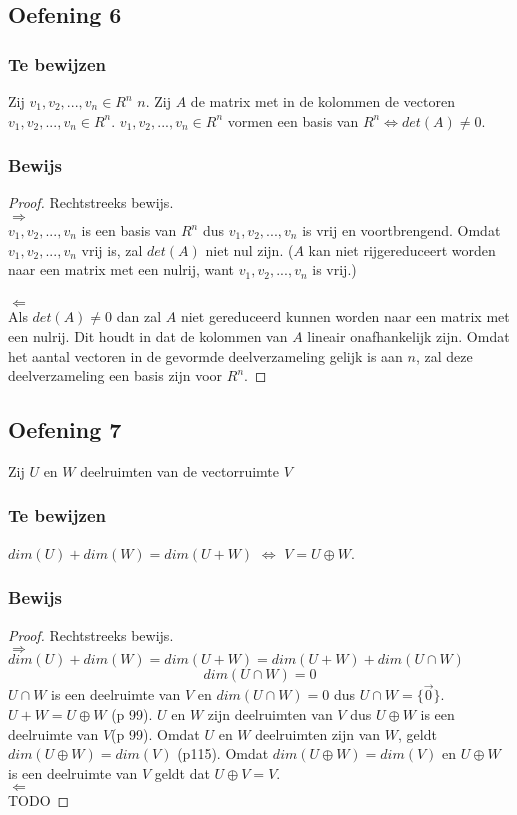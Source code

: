\documentclass[lineaire_algebra_oplossingen.tex]{subfiles}
\begin{document}
\subsection{Oefening 6}
\subsubsection*{Te bewijzen}
Zij $v_1,v_2,...,v_n \in R^n$ $n$. Zij $A$ de matrix met in de kolommen de vectoren $v_1,v_2,...,v_n \in R^n$.
$v_1,v_2,...,v_n \in R^n$ vormen een basis van $R^n \Leftrightarrow det(A) \neq 0$.
\subsubsection*{Bewijs}
\begin{proof}
Rechtstreeks bewijs.\\
\emph{$\Rightarrow$}\\
$v_1,v_2,...,v_n$ is een basis van $R^n$ dus $v_1,v_2,...,v_n$ is vrij en voortbrengend. Omdat $v_1,v_2,...,v_n$ vrij is, zal $det(A)$ niet nul zijn. ($A$ kan niet rijgereduceert worden naar een matrix met een nulrij, want $v_1,v_2,...,v_n$ is vrij.)\\\\
\emph{$\Leftarrow$}\\
Als $det(A) \neq 0$ dan zal $A$ niet gereduceerd kunnen worden naar een matrix met een nulrij. Dit houdt in dat de kolommen van $A$ lineair onafhankelijk zijn. Omdat het aantal vectoren in de gevormde deelverzameling gelijk is aan $n$, zal deze deelverzameling een basis zijn voor $R^n$.
\end{proof}

\subsection{Oefening 7}
Zij $U$ en $W$ deelruimten van de vectorruimte $V$
\subsubsection*{Te bewijzen}
$dim(U) + dim(W) = dim(U+W)$ $\Leftrightarrow$ $V = U \oplus W$.
\subsubsection*{Bewijs}
\begin{proof}
Rechtstreeks bewijs.\\
\emph{$\Rightarrow$}\\
$dim(U) + dim(W) = dim(U+W)= dim(U+W) + dim(U\cap W)$
\[
dim(U\cap W) = 0
\]
$U \cap W$ is een deelruimte van $V$ en $dim(U\cap W) = 0$ dus $U \cap W = \{\vec{0}\}$.
$U+W = U\oplus W$ (p 99). $U$ en $W$ zijn deelruimten van $V$ dus $U\oplus W$ is een deelruimte van $V$(p 99). Omdat $U$ en $W$ deelruimten zijn van $W$, geldt $dim(U \oplus W) = dim(V)$ (p115). Omdat $dim(U \oplus W) = dim(V)$ en $U \oplus W$ is een deelruimte van $V$ geldt dat $U \oplus V = V$.\\
\emph{$\Leftarrow$}\\
TODO
\end{proof}
\end{document}
